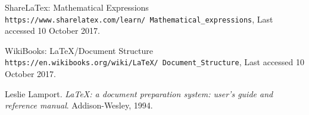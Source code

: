 \documentclass[11pt,twocolumn]{article}
\begin{document}
\begin{thebibliography}{9}
ShareLaTex: Mathematical Expressions
\\\texttt{https://www.sharelatex.com/learn/
Mathematical_expressions},
Last accessed 10 October 2017.

WikiBooks: {\LaTeX}/Document Structure
\\\texttt{https://en.wikibooks.org/wiki/LaTeX/
Document_Structure},
Last accessed 10 October 2017.

Leslie Lamport.
\textit{{\LaTeX}: a document preparation system: user's guide and reference manual}.
Addison-Wesley, 1994.

\end{thebibliography}
\end{document}
